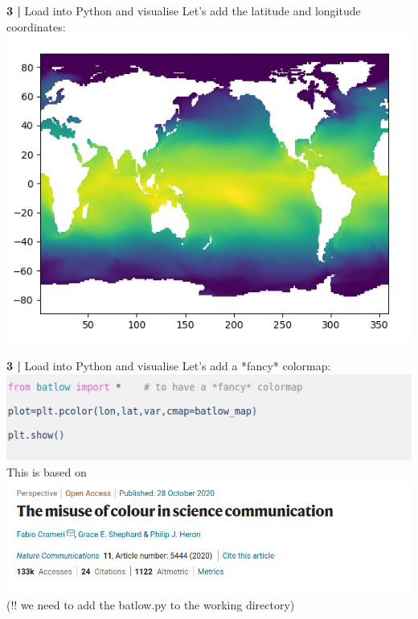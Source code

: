   
\begin{frame}{\textbf{3 |} Load into Python and visualise} 
    Let's add the latitude and longitude coordinates:\\
        \vspace{0.5cm}
    \includegraphics[scale=0.35]{images/Script1_fig2.png}
\end{frame}
 
 
\begin{frame}{\textbf{3 |} Load into Python and visualise} 
     Let's add a *fancy* colormap:\\
        \vspace{0.5cm}
    \includegraphics[scale=0.35]{images/Script1_step5.png}\\
        \vspace{0.5cm} This is based on \\
    \includegraphics[scale=0.35]{images/Nature.png}\\
    (!! we need to add the batlow.py to the working directory)
\end{frame}
 
